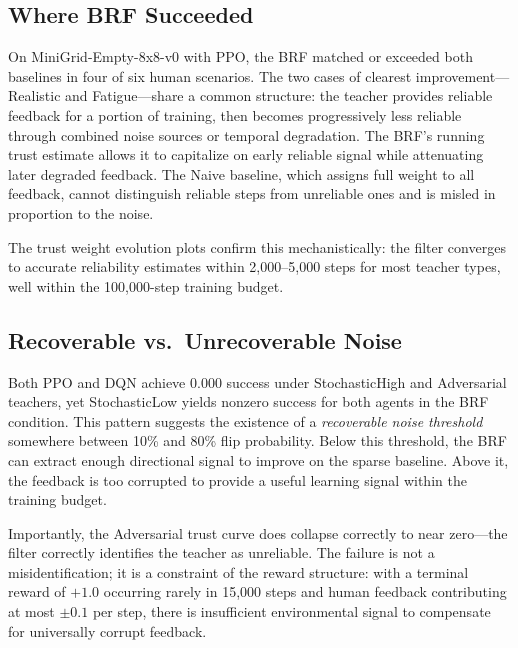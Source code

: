 \documentclass[11pt]{article}
\begin{document}
\subsection{Where BRF Succeeded}

On MiniGrid-Empty-8x8-v0 with PPO, the BRF matched or exceeded both baselines
in four of six human scenarios. The two cases of clearest improvement---Realistic
and Fatigue---share a common structure: the teacher provides reliable feedback
for a portion of training, then becomes progressively less reliable through
combined noise sources or temporal degradation. The BRF's running trust estimate
allows it to capitalize on early reliable signal while attenuating later degraded
feedback. The Naive baseline, which assigns full weight to all feedback, cannot
distinguish reliable steps from unreliable ones and is misled in proportion to
the noise.

The trust weight evolution plots confirm this mechanistically: the filter
converges to accurate reliability estimates within 2{,}000--5{,}000 steps for
most teacher types, well within the 100{,}000-step training budget.

\subsection{Recoverable vs.\ Unrecoverable Noise}

Both PPO and DQN achieve 0.000 success under StochasticHigh and Adversarial
teachers, yet StochasticLow yields nonzero success for both agents in the BRF
condition. This pattern suggests the existence of a \emph{recoverable noise
threshold} somewhere between 10\% and 80\% flip probability. Below this
threshold, the BRF can extract enough directional signal to improve on the
sparse baseline. Above it, the feedback is too corrupted to provide a useful
learning signal within the training budget.

Importantly, the Adversarial trust curve does collapse correctly to near
zero---the filter correctly identifies the teacher as unreliable. The failure is
not a misidentification; it is a constraint of the reward structure: with a
terminal reward of $+1.0$ occurring rarely in 15{,}000 steps and human feedback
contributing at most $\pm 0.1$ per step, there is insufficient environmental
signal to compensate for universally corrupt feedback.

\end{document}
